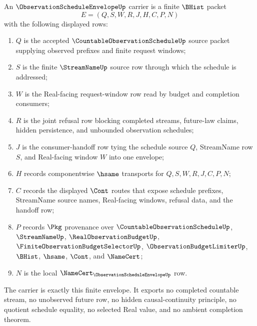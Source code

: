 \begin{definition}
\label{def:observation-schedule-envelope-carrier}
An $\ObservationScheduleEnvelopeUp$ carrier is a finite $\BHist$ packet
$$
E=(Q,S,W,R,J,H,C,P,N)
$$
with the following displayed rows:
\begin{enumerate}
\item $Q$ is the accepted $\CountableObservationScheduleUp$ source packet supplying observed prefixes and finite request windows;
\item $S$ is the finite $\StreamNameUp$ source row through which the schedule is addressed;
\item $W$ is the Real-facing request-window row read by budget and completion consumers;
\item $R$ is the joint refusal row blocking completed streams, future-law claims, hidden persistence, and unbounded observation schedules;
\item $J$ is the consumer-handoff row tying the schedule source $Q$, StreamName row $S$, and Real-facing window $W$ into one envelope;
\item $H$ records componentwise $\hsame$ transports for $Q,S,W,R,J,C,P,N$;
\item $C$ records the displayed $\Cont$ routes that expose schedule prefixes, StreamName source names, Real-facing windows, refusal data, and the handoff row;
\item $P$ records $\Pkg$ provenance over $\CountableObservationScheduleUp$, $\StreamNameUp$, $\RealObservationBudgetUp$, $\FiniteObservationBudgetSelectorUp$, $\ObservationBudgetLimiterUp$, $\BHist$, $\hsame$, $\Cont$, and $\NameCert$;
\item $N$ is the local $\NameCert_{\ObservationScheduleEnvelopeUp}$ row.
\end{enumerate}
The carrier is exactly this finite envelope. It exports no completed countable stream, no unobserved future row, no hidden causal-continuity principle, no quotient schedule equality, no selected Real value, and no ambient completion theorem.
\end{definition}

